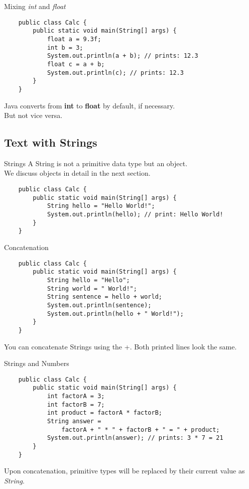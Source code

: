\begin{frame}[fragile]{Mixing \emph{int} and \emph{float}}
    \begin{lstlisting}
    public class Calc {
        public static void main(String[] args) {
            float a = 9.3f;
            int b = 3;
            System.out.println(a + b); // prints: 12.3
            float c = a + b;
            System.out.println(c); // prints: 12.3
        }
    }\end{lstlisting}
    Java converts from \textbf{int} to \textbf{float} by default, if necessary. \\
    But not vice versa.
\end{frame}

\subsection{Text with Strings}

\begin{frame}[fragile]{Strings}
    A String is not a primitive data type but an object. \\
    We discuss objects in detail in the next section.
    \begin{lstlisting}
    public class Calc {
        public static void main(String[] args) {
            String hello = "Hello World!";
            System.out.println(hello); // print: Hello World!
        }
    }\end{lstlisting}
\end{frame}

\begin{frame}[fragile]{Concatenation}
    \begin{lstlisting}
    public class Calc {
        public static void main(String[] args) {
            String hello = "Hello";
            String world = " World!";
            String sentence = hello + world;
            System.out.println(sentence);
            System.out.println(hello + " World!");
        }
    }\end{lstlisting}
    You can concatenate Strings using the +. Both printed lines look the same.
\end{frame}

\begin{frame}[fragile]{Strings and Numbers}
    \begin{lstlisting}
    public class Calc {
        public static void main(String[] args) {
            int factorA = 3;
            int factorB = 7;
            int product = factorA * factorB;
            String answer =
                factorA + " * " + factorB + " = " + product;
            System.out.println(answer); // prints: 3 * 7 = 21
        }
    }\end{lstlisting}
    Upon concatenation, primitive types will be replaced by their current value as \emph{String}.
\end{frame}



